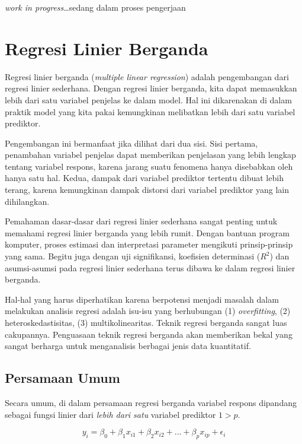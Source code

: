\documentclass[
]{book}
\begin{document}
\emph{work in progress}\ldots sedang dalam proses pengerjaan

\hypertarget{regresi-linier-berganda}{%
\chapter{Regresi Linier Berganda}\label{regresi-linier-berganda}}

Regresi linier berganda (\emph{multiple linear regression}) adalah pengembangan dari regresi linier sederhana. Dengan regresi linier berganda, kita dapat memasukkan lebih dari satu variabel penjelas ke dalam model. Hal ini dikarenakan di dalam praktik model yang kita pakai kemungkinan melibatkan lebih dari satu variabel prediktor.

Pengembangan ini bermanfaat jika dilihat dari dua sisi. Sisi pertama, penambahan variabel penjelas dapat memberikan penjelasan yang lebih lengkap tentang variabel respons, karena jarang suatu fenomena hanya disebabkan oleh hanya satu hal. Kedua, dampak dari variabel prediktor tertentu dibuat lebih terang, karena kemungkinan dampak distorsi dari variabel prediktor yang lain dihilangkan.

Pemahaman dasar-dasar dari regresi linier sederhana sangat penting untuk memahami regresi linier berganda yang lebih rumit. Dengan bantuan program komputer, proses estimasi dan interpretasi parameter mengikuti prinsip-prinsip yang sama. Begitu juga dengan uji signifikansi, koefisien determinasi (\(R^2\)) dan asumsi-asumsi pada regresi linier sederhana terus dibawa ke dalam regresi linier berganda.

Hal-hal yang harus diperhatikan karena berpotensi menjadi masalah dalam melakukan analisis regresi adalah isu-isu yang berhubungan (1) \emph{overfitting}, (2) heteroskedastisitas, (3) multikolinearitas. Teknik regresi berganda sangat luas cakupannya. Penguasaan teknik regresi berganda akan memberikan bekal yang sangat berharga untuk menganalisis berbagai jenis data kuantitatif.

\hypertarget{persamaan-umum}{%
\section{Persamaan Umum}\label{persamaan-umum}}

Secara umum, di dalam persamaan regresi berganda variabel respons dipandang sebagai fungsi linier dari \emph{lebih dari satu} variabel prediktor \(1>p\).

\begin{equation} 
y_i=\beta_0 + \beta_1x_{i1} + \beta_2x_{i2} + ... + \beta_px_{ip} + \epsilon_i
\label{eq:persamaan-ganda}
\end{equation}
\end{document}

